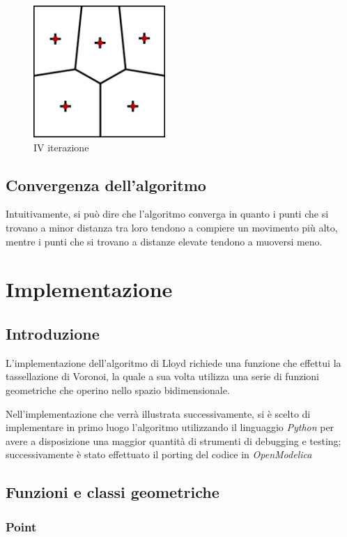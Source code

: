\documentclass[10pt,a4paper]{article}
\begin{document}
\begin{figure}[H]
\includegraphics[width=5cm]{lloyd_iterazione_4.png}
\centering
\caption{IV iterazione}
\end{figure}

\subsection{Convergenza dell'algoritmo}

Intuitivamente, si può dire che l'algoritmo converga in quanto i punti che si trovano a minor distanza tra loro tendono a compiere un movimento più alto, mentre i punti che si trovano a distanze elevate tendono a muoversi meno.


\section{Implementazione}

\subsection{Introduzione}

L'implementazione dell'algoritmo di Lloyd richiede una funzione che effettui la tassellazione di Voronoi, la quale a sua volta utilizza una serie di funzioni geometriche che operino nello spazio bidimensionale.

Nell'implementazione che verrà illustrata successivamente, si è scelto di implementare in primo luogo l'algoritmo utilizzando il linguaggio \textit{Python} per avere a disposizione una maggior quantità di strumenti di debugging e testing; successivamente è stato effettuato il porting del codice in \textit{OpenModelica} 

\subsection{Funzioni e classi geometriche}

\subsubsection{Point}
\end{document}
